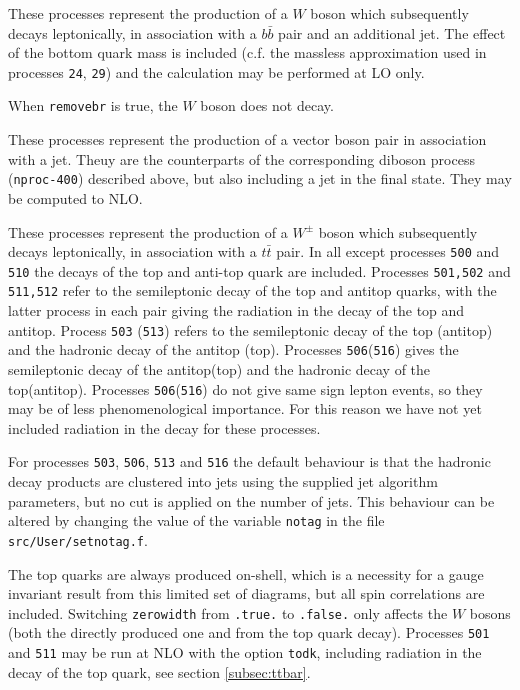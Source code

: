 \label{subsec:wbbjetmassive}

These processes represent the production of a $W$ boson which subsequently
decays leptonically, in association with a $b{\bar b}$ pair and an
additional jet. The effect of the bottom quark mass is included (c.f. the massless approximation
used in processes {\tt 24}, {\tt 29})
and the calculation may be performed at LO only.

When {\tt removebr} is true, the $W$ boson does not decay.

\label{subsec:dibosonjet}

These processes represent the production of a vector boson pair in association
with a jet.  Theuy are the counterparts of the corresponding diboson process
(\texttt{nproc-400}) described above, but also including a jet in the final
state.  They may be computed to NLO.

\label{subsec:wttdecay}

These processes represent the production of a $W^\pm$ boson which subsequently
decays leptonically, in association with a $t{\bar t}$ pair. In all except processes 
{\tt 500} and {\tt 510} the decays of the top and anti-top quark are included.
Processes {\tt 501,502} and {\tt 511,512} refer to the semileptonic decay of the top and antitop quarks,
with the latter process in each pair giving the radiation in the decay of the top and antitop.
Process {\tt 503} ({\tt 513}) refers to the semileptonic decay of the top (antitop)
and the hadronic decay of the antitop (top). Processes {\tt 506}({\tt 516}) gives the semileptonic
decay of the antitop(top) and the hadronic decay of the top(antitop).  Processes {\tt 506}({\tt 516}) 
do not give same sign lepton events, so they may be of less phenomenological importance. For this reason 
we have not yet included radiation in the decay for these processes. 

For processes {\tt 503}, {\tt 506}, {\tt 513}
and {\tt 516} the default behaviour is that the hadronic decay products
are clustered into jets using the supplied jet
algorithm parameters, but no cut is applied on the number of jets.
This behaviour can be altered by changing the value of the
variable {\tt notag} in the file {\tt src/User/setnotag.f}.

The top quarks are always
produced on-shell, which is a necessity for a gauge invariant result
from this limited set of diagrams, but all spin correlations are included.
Switching {\tt zerowidth} from {\tt .true.} to {\tt .false.} only affects
the $W$ bosons (both the directly produced one and from the top quark decay).
Processes {\tt 501} and {\tt 511} may be run at NLO with the option {\tt todk},
including radiation in the decay of the top quark, see section \ref{subsec:ttbar}.






